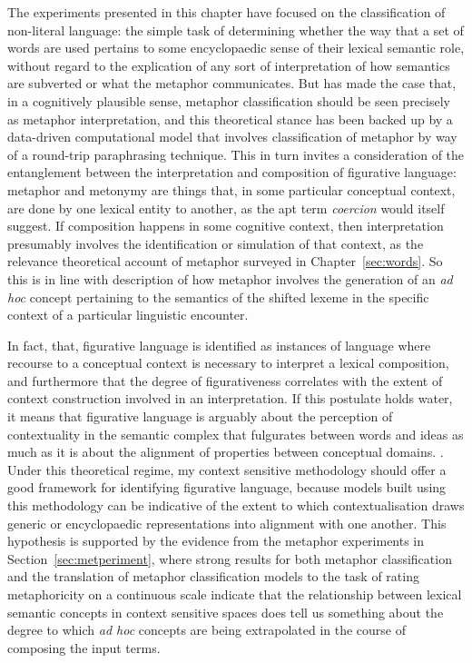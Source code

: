 The experiments presented in this chapter have focused on the classification of non-literal language: the simple task of determining whether the way that a set of words are used pertains to some encyclopaedic sense of their lexical semantic role, without regard to the explication of any sort of interpretation of how semantics are subverted or what the metaphor communicates.  But \cite{Shutova2010} has made the case that, in a cognitively plausible sense, metaphor classification should be seen precisely as metaphor interpretation, and this theoretical stance has been backed up by a data-driven computational model that involves classification of metaphor by way of a round-trip paraphrasing technique.  This in turn invites a consideration of the entanglement between the interpretation and composition of figurative language: metaphor and metonymy are things that, in some particular conceptual context, are done by one lexical entity to another, as the apt term \emph{coercion} would itself suggest.  If composition happens in some cognitive context, then interpretation presumably involves the identification or simulation of that context, as the relevance theoretical account of metaphor surveyed in Chapter~\ref{sec:words}.  So this is in line with  description of how metaphor involves the generation of an \emph{ad hoc} concept pertaining to the semantics of the shifted lexeme in the specific context of a particular linguistic encounter.

In fact,   that,  figurative language is identified   as  instances of language where recourse to a conceptual context is necessary to interpret a lexical composition, and furthermore that the degree of figurativeness correlates with the extent of context construction involved in an interpretation.  If this postulate holds water, it means that figurative language is arguably about the perception of contextuality in the semantic complex that fulgurates between words and ideas as much as it is about the alignment of properties between conceptual domains.   \cite{ArzouanEA2007}.  Under this theoretical regime, my context sensitive methodology should offer a good framework for identifying figurative language, because models built using this methodology can be indicative of the extent to which contextualisation draws generic or encyclopaedic representations into alignment with one another.  This hypothesis is supported by the evidence from the metaphor experiments in Section~\ref{sec:metperiment}, where strong results for both metaphor classification and the translation of metaphor classification models to the task of rating metaphoricity on a continuous scale indicate that the relationship between lexical semantic concepts in context sensitive spaces does tell us something about the degree to which \emph{ad hoc} concepts are being extrapolated in the course of composing the input terms.

